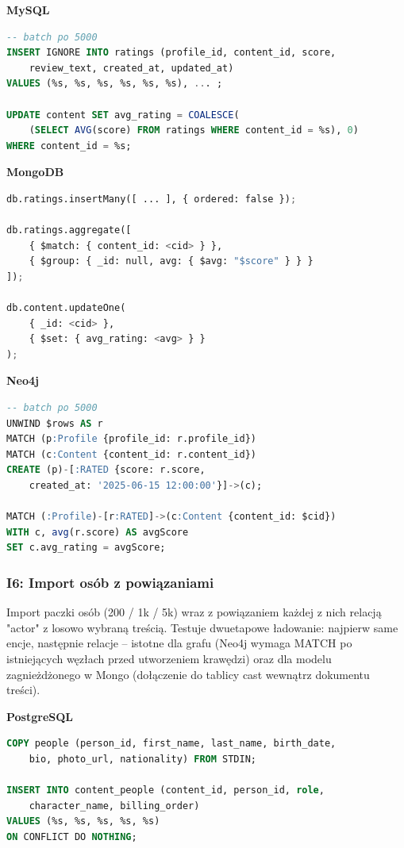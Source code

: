 \textbf{MySQL}
\begin{lstlisting}[language=SQL]
-- batch po 5000
INSERT IGNORE INTO ratings (profile_id, content_id, score,
    review_text, created_at, updated_at)
VALUES (%s, %s, %s, %s, %s, %s), ... ;

UPDATE content SET avg_rating = COALESCE(
    (SELECT AVG(score) FROM ratings WHERE content_id = %s), 0)
WHERE content_id = %s;
\end{lstlisting}

\textbf{MongoDB}
\begin{lstlisting}[language=Python]
db.ratings.insertMany([ ... ], { ordered: false });

db.ratings.aggregate([
    { $match: { content_id: <cid> } },
    { $group: { _id: null, avg: { $avg: "$score" } } }
]);

db.content.updateOne(
    { _id: <cid> },
    { $set: { avg_rating: <avg> } }
);
\end{lstlisting}

\textbf{Neo4j}
\begin{lstlisting}[language=SQL]
-- batch po 5000
UNWIND $rows AS r
MATCH (p:Profile {profile_id: r.profile_id})
MATCH (c:Content {content_id: r.content_id})
CREATE (p)-[:RATED {score: r.score,
    created_at: '2025-06-15 12:00:00'}]->(c);

MATCH (:Profile)-[r:RATED]->(c:Content {content_id: $cid})
WITH c, avg(r.score) AS avgScore
SET c.avg_rating = avgScore;
\end{lstlisting}


\subsubsection{I6: Import osób z powiązaniami}

Import paczki osób (200 / 1k / 5k) wraz z powiązaniem każdej z nich relacją
"actor" z losowo wybraną treścią. Testuje dwuetapowe ładowanie: najpierw same
encje, następnie relacje -- istotne dla grafu (Neo4j wymaga MATCH po istniejących węzłach przed
utworzeniem krawędzi) oraz dla modelu zagnieżdżonego w Mongo (dołączenie
do tablicy cast wewnątrz dokumentu treści).

\textbf{PostgreSQL}
\begin{lstlisting}[language=SQL]
COPY people (person_id, first_name, last_name, birth_date,
    bio, photo_url, nationality) FROM STDIN;

INSERT INTO content_people (content_id, person_id, role,
    character_name, billing_order)
VALUES (%s, %s, %s, %s, %s)
ON CONFLICT DO NOTHING;
\end{lstlisting}

